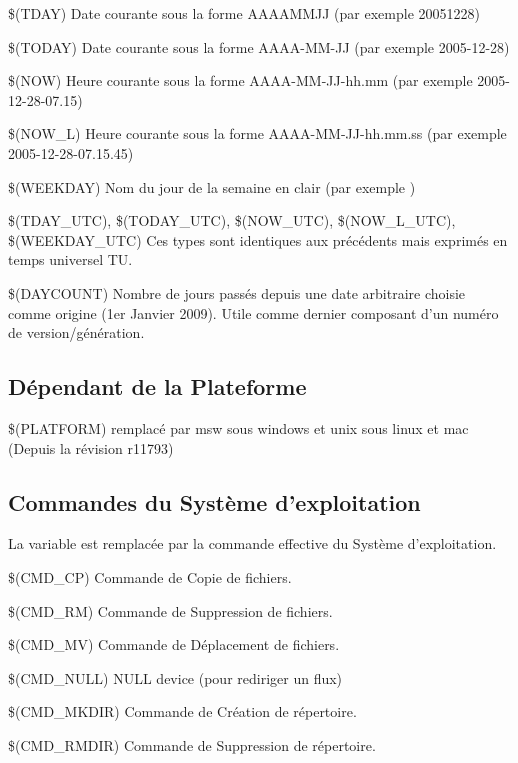 \begin{codeentry}
\item[\$(TDAY)] Date courante sous la forme AAAAMMJJ (par exemple 20051228)
\item[\$(TODAY)] Date courante sous la forme AAAA-MM-JJ (par exemple 2005-12-28)
\item[\$(NOW)] Heure courante sous la forme AAAA-MM-JJ-hh.mm (par exemple 2005-12-28-07.15)
\item[\$(NOW\_L)] Heure courante sous la forme AAAA-MM-JJ-hh.mm.ss (par exemple 2005-12-28-07.15.45)
\item[\$(WEEKDAY)]  Nom du jour de la semaine en clair (par exemple )
\item[\$(TDAY\_UTC), \$(TODAY\_UTC), \$(NOW\_UTC), \$(NOW\_L\_UTC), \$(WEEKDAY\_UTC)] Ces types sont identiques aux précédents mais exprimés en temps universel TU.
\item[\$(DAYCOUNT)] Nombre de jours passés depuis une date arbitraire choisie comme origine (1er Janvier 2009). Utile comme dernier composant d'un numéro de version/génération.
\end{codeentry}

\subsection{Dépendant de la Plateforme}

\begin{codeentry}
\item[\$(PLATFORM)] remplacé par msw sous windows et unix sous linux et mac (Depuis la révision r11793) 
\end{codeentry}

\subsection{Commandes du Système d'exploitation}
La variable est remplacée par la commande effective du Système d'exploitation.
\begin{codeentry}
\item[\$(CMD\_CP)] Commande de Copie de fichiers.
\item[\$(CMD\_RM)] Commande de Suppression de fichiers.
\item[\$(CMD\_MV)] Commande de Déplacement de fichiers.
\item[\$(CMD\_NULL)] NULL device (pour rediriger un flux)
\item[\$(CMD\_MKDIR)] Commande de Création de répertoire.
\item[\$(CMD\_RMDIR)] Commande de Suppression de répertoire.
\end{codeentry}

